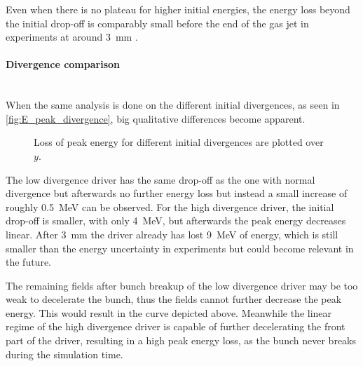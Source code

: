 \documentclass[bachelor_thesis]{subfiles}
\begin{document}
Even when there is no plateau for higher initial energies, the energy loss beyond the initial drop-off is comparably small before the end of the gas jet in experiments at around \qty{3}{\mm} \cite{Schoebel2022}.

\paragraph*{Divergence comparison}\hspace{0pt} \\
When the same analysis is done on the different initial divergences, as seen in \autoref{fig:E_peak_divergence}, big qualitative differences become apparent. 
\begin{figure}
	\centering
	
	\caption{Loss of peak energy for different initial divergences are plotted over $y$.}
	\label{fig:E_peak_divergence}
\end{figure}
The low divergence driver has the same drop-off as the one with normal divergence but afterwards no further energy loss but instead a small increase of roughly \qty{0.5}{\MeV} can be observed.
For the high divergence driver, the initial drop-off is smaller, with only \qty{4}{\MeV}, but afterwards the peak energy decreases linear. After \qty{3}{\mm} the driver already has lost \qty{9}{\MeV} of energy, which is still smaller than the energy uncertainty in experiments \cite{Schoebel2022} but could become relevant in the future.

The remaining fields after bunch breakup of the low divergence driver may be too weak to decelerate the bunch, thus the fields cannot further decrease the peak energy. This would result in the curve depicted above. 
Meanwhile the linear regime of the high divergence driver is capable of further decelerating the front part of the driver, resulting in a high peak energy loss, as the bunch never breaks during the simulation time. 
\end{document}

